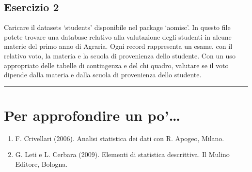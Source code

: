 \documentclass[a4paper,12pt,oneside]{book}
\providecommand{\tightlist}{%
  \setlength{\itemsep}{0pt}\setlength{\parskip}{0pt}}
\begin{document}
\hypertarget{esercizio-2}{%
\subsection*{Esercizio 2}\label{esercizio-2}}

Caricare il datasets `students' disponibile nel package `aomisc'. In questo file potete trovare una database relativo alla valutazione degli studenti in alcune materie del primo anno di Agraria. Ogni record rappresenta un esame, con il relativo voto, la materia e la scuola di provenienza dello studente. Con un uso appropriato delle tabelle di contingenza e del chi quadro, valutare se il voto dipende dalla materia e dalla scuola di provenienza dello studente.

\begin{center}\rule{0.5\linewidth}{\linethickness}\end{center}

\hypertarget{per-approfondire-un-po-11}{%
\section{Per approfondire un po'\ldots{}}\label{per-approfondire-un-po-11}}

\begin{enumerate}
\def\labelenumi{\arabic{enumi}.}
\tightlist
\item
  F. Crivellari (2006). Analisi statistica dei dati con R. Apogeo, Milano.
\item
  G. Leti e L. Cerbara (2009). Elementi di statistica descrittiva. Il Mulino Editore, Bologna.
\end{enumerate}
\end{document}
